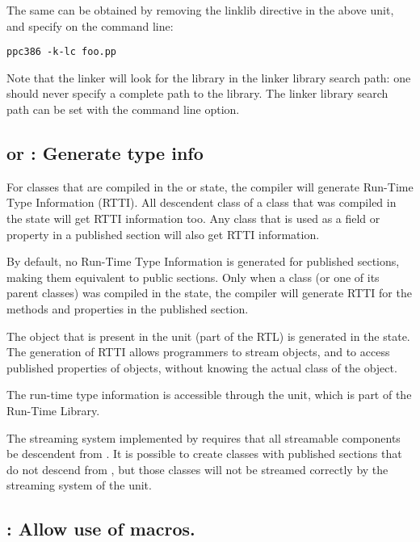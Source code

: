 The same can be obtained by removing the linklib directive in the
above unit, and specify  on the command line:
\begin{verbatim}
ppc386 -k-lc foo.pp
\end{verbatim}
Note that the linker will look for the library in the linker library search path:
one should never specify a complete path to the library.
The linker library search path can be set with the  command line option.

\subsection{ or  : Generate type info}

For classes that are compiled in the  or 
state, the compiler will generate Run-Time Type Information (RTTI). All
descendent class of a class that was compiled in the  state
will get RTTI information too. Any class that is used as a field or property 
in a published section will also get RTTI information.

By default, no Run-Time Type Information is generated for published
sections, making them equivalent to public sections. Only when a class
(or one of its parent classes) was compiled in the  state, the
compiler will generate RTTI for the methods and properties in the published
section.

The  object that is present in the  unit 
(part of the RTL) is generated in the  state. The generation 
of RTTI allows programmers to stream objects, and to access published 
properties of objects, without knowing the actual class of the object.

The run-time type information is accessible through the  unit,
which is part of the \fpc Run-Time Library.

\begin{remark}
The streaming system implemented by \fpc requires that all
streamable components be descendent from . It is possible
to create classes with published sections that do not descend from
, but those classes will not be streamed correctly by the
streaming system of the  unit. 
\end{remark}

\subsection{ : Allow use of macros.}

